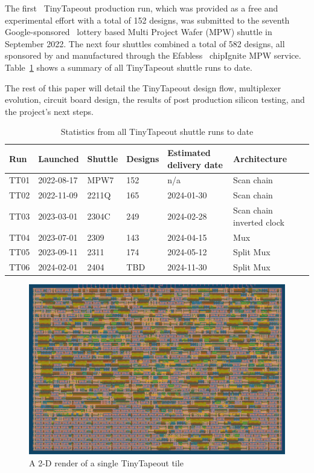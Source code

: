 The first~\cite{firstshuttle} TinyTapeout production run, which was provided as a free and experimental effort with a total of 152 designs, was submitted to the seventh Google-sponsored~\cite{googlesponsored} lottery based Multi Project Wafer (MPW) shuttle in September 2022.
The next four shuttles combined a total of 582 designs, all sponsored by and manufactured through the Efabless~\cite{efabless} chipIgnite MPW service. Table~\ref{tab:tinytapeout} shows a summary of all TinyTapeout shuttle runs to date.

The rest of this paper will detail the TinyTapeout design flow, multiplexer evolution, circuit board design, the results of post production silicon testing, and the project's next steps.

\begin{table}[!t]
\centering
\caption{Statistics from all TinyTapeout shuttle runs to date}
\label{tab:tinytapeout}
\begin{tabularx}{\textwidth}{@{}l *{6}{X}@{}}
\toprule
\textbf{Run} & \textbf{Launched} & \textbf{Shuttle} & \textbf{Designs} & \textbf{Estimated delivery date} & \textbf{Architecture} \\
\midrule
TT01 & 2022-08-17  & MPW7  & 152 & n/a        & Scan chain \\
TT02 & 2022-11-09  & 2211Q & 165 & 2024-01-30 & Scan chain \\
TT03 & 2023-03-01  & 2304C & 249 & 2024-02-28 & Scan chain inverted clock \\
TT04 & 2023-07-01  & 2309  & 143 & 2024-04-15 & Mux \\
TT05 & 2023-09-11  & 2311  & 174 & 2024-05-12 & Split Mux \\
TT06 & 2024-02-01  & 2404  & TBD & 2024-11-30 & Split Mux \\
\bottomrule
\end{tabularx}
\end{table}

\begin{figure}[!t]
\centering
\includegraphics[width=\columnwidth]{./Figs/gh action gds layout.png}
\caption{A 2-D render of a single TinyTapeout tile}
\label{fig:render_cells_in_use}
\end{figure}

